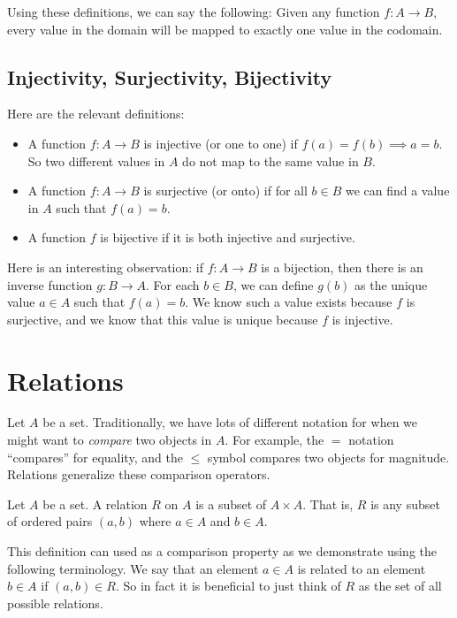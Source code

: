 Using these definitions, we can say the following: Given any function $f:A \to B$, every value in the domain will be mapped to exactly one value in the codomain.

\subsection{Injectivity, Surjectivity, Bijectivity}

Here are the relevant definitions:
\begin{itemize}
    \item A function $f:A \to B$ is injective (or one to one) if $f(a) = f(b) \implies a = b$. So two different values in $A$ do not map to the same value in $B$.
    \item A function $f:A \to B$ is surjective (or onto) if for all $b \in B$ we can find a value in $A$ such that $f(a) = b$.
    \item A function $f$ is bijective if it is both injective and surjective.
\end{itemize}

Here is an interesting observation: if $f: A \to B$ is a bijection, then there is an inverse function $g: B \to A$. For each $b \in B$, we can define $g(b)$ as the unique value $a \in A$ such that $f(a) = b$. We know such a value exists because $f$ is surjective, and we know that this value is unique because $f$ is injective.


\section{Relations}

Let $A$ be a set. Traditionally, we have lots of different notation for when we might want to \textit{compare} two objects in $A$. For example, the $=$ notation ``compares'' for equality, and the $\leq$ symbol compares two objects for magnitude. Relations generalize these comparison operators.

\begin{definition}
Let $A$ be a set. A relation $R$ on $A$ is a subset of $A \times A$. That is, $R$ is any subset of ordered pairs $(a, b)$ where $a \in A$ and $b \in A$.
\end{definition}

This definition can used as a comparison property as we demonstrate using the following terminology. We say that an element $a \in A$ is related to an element $b \in A$ if $(a, b) \in R$. So in fact it is beneficial to just think of $R$ as the set of all possible relations.

